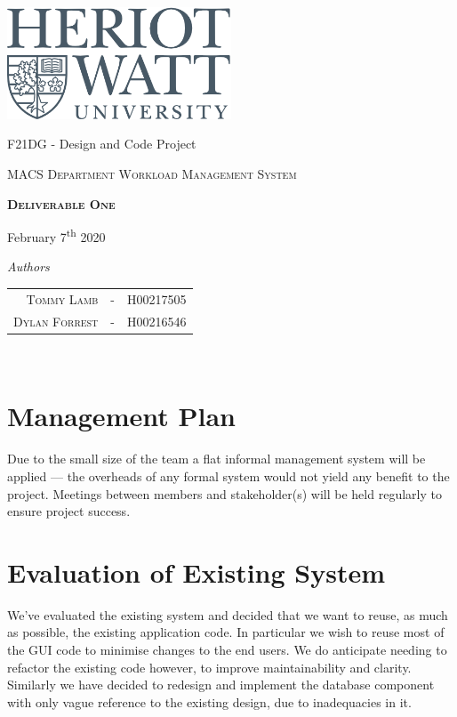 \documentclass[11pt, a4paper]{article}
\begin{document}
\begin{titlepage}
	\thispagestyle{empty}
	{\centering
		\includegraphics[width=0.5\textwidth]{heriot-watt-logo.png}\par\vspace{1cm}
		\vspace{1cm}
		{\LARGE F21DG - Design and Code Project\par}
		{\LARGE \par}
		\vspace{1.5cm}
		{\scshape\Large MACS Department Workload Management System\par}
		\vspace{1.5cm}
		{\scshape\LARGE\bfseries Deliverable One \par}

		\vspace{3.5cm}
			\begin{center}
					February 7\textsuperscript{th} 2020
			\end{center}
		\textit{Authors}\par
		\begin{tabular}{rcl}
			\\ \textsc{Tommy Lamb} & - & H00217505\\
			\textsc{Dylan Forrest} & - & H00216546\\
		\end{tabular} \\
	
	}
\end{titlepage}

\tableofcontents
\pagebreak

\section{Management Plan}
Due to the small size of the team a flat informal management system will be applied --- the overheads of any formal system would not yield any benefit to the project. Meetings between members and stakeholder(s) will be held regularly to ensure project success.

\section{Evaluation of Existing System}
We've evaluated the existing system and decided that we want to reuse, as much as possible, the existing application code. In particular we wish to reuse most of the GUI code to minimise changes to the end users. We do anticipate needing to refactor the existing code however, to improve maintainability and clarity. Similarly we have decided to redesign and implement the database component with only vague reference to the existing design, due to inadequacies in it.
\end{document}
